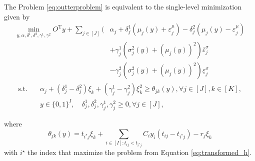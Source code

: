 \documentclass{beamer}
\newcommand{\T}{\mathrm{T}}
\begin{document}
\begin{frame}[allowframebreaks]
	\framebreak
	\begin{theorem}
		The Problem \ref{eq:outterproblem} is equivalent to the single-level minimization given by
		\begin{align*}
			\min_{y, \alpha, \delta^1, \delta^2, \gamma^1, \gamma^2} O^\T y + \sum_{j \in [J]} \Bigg( &\alpha_j + \delta_j^1 \left(\mu_j(y) + \varepsilon_j^\mu\right) - \delta_j^2 \left(\mu_j(y) - \varepsilon_j^\mu\right) \\
			& + \gamma_j^1 \left(\sigma_j^2(y) + (\mu_j(y))^2\right)\overline{\varepsilon}_j^\sigma \\
			& - \gamma_j^2 \left(\sigma_j^2(y) + (\mu_j(y))^2\right)\underline{\varepsilon}_j^\sigma
		\end{align*}
		\begin{align*}
			\text{s.t.}\quad &\alpha_j + (\delta_j^1 - \delta_j^2)\xi_k + (\gamma_j^1 - \gamma_j^2)\xi_k^2 \ge \theta_{jk}(y), \forall j \in [J], k \in [K], \\
			& y \in \{0, 1\}^I, \quad \delta_j^1, \delta_j^2, \gamma_j^1, \gamma_j^2 \ge 0, \forall j \in [J],
		\end{align*}
	\end{theorem}
	
	\framebreak
	\begin{theorem}
		where
		\begin{equation*}
			\theta_{jk}(y) = t_{i^\star j} \xi_k + \sum_{i \in [I]: t_{ij} < t_{i^\star j}} C_i y_i (t_{ij} - t_{i^\star j}) - r_j \xi_k
		\end{equation*}
		with $i^\star$ the index that maximize the problem from Equation \ref{eq:transformed_h}.
	\end{theorem}
\end{frame}
\end{document}
